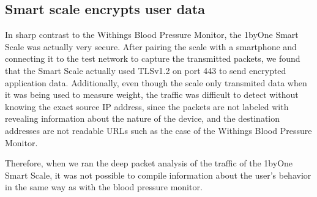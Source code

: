 \subsection{Smart scale encrypts user data}
In sharp contrast to the Withings Blood Pressure Monitor, the 1byOne Smart Scale was actually very secure. After pairing the scale with a smartphone and connecting it to the test network to capture the transmitted packets, we found that the Smart Scale actually used TLSv1.2 on port 443 to send encrypted application data. Additionally, even though the scale only transmited data when it was being used to measure weight, the traffic was difficult to detect without knowing the exact source IP address, since the packets are not labeled with revealing information about the nature of the device, and the destination addresses are not readable URLs such as the case of the Withings Blood Pressure Monitor. 

Therefore, when we ran the deep packet analysis of the traffic of the 1byOne Smart Scale, it was not possible to compile information about the user's behavior in the same way as with the blood pressure monitor. 
